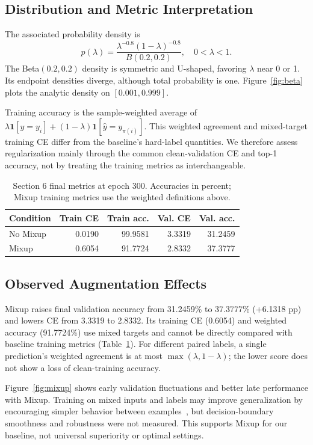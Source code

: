 \documentclass[letterpaper]{article}
\begin{document}
\subsection{Distribution and Metric Interpretation}
The associated probability density is
\begin{equation}
p(\lambda)=\frac{\lambda^{-0.8}(1-\lambda)^{-0.8}}{B(0.2,0.2)},
\quad 0<\lambda<1.
\end{equation}
The Beta$(0.2,0.2)$ density is symmetric and U-shaped, favoring $\lambda$ near
0 or 1. Its endpoint densities diverge, although total probability is one.
Figure~\ref{fig:beta} plots the analytic density on $[0.001,0.999]$.


Training accuracy is the sample-weighted average of
$\lambda\mathbf1[\hat y=y_i]+(1-\lambda)\mathbf1[\hat y=y_{\pi(i)}]$.
This weighted agreement and mixed-target training CE differ from the baseline's
hard-label quantities. We therefore assess regularization mainly through the
common clean-validation CE and top-1 accuracy, not by treating the training
metrics as interchangeable.

\begin{table}[t]
\centering\small
\begin{tabular}{lrrrr}\toprule
Condition & Train CE & Train acc. & Val. CE & Val. acc.\\\midrule
No Mixup & 0.0190 & 99.9581 & 3.3319 & 31.2459 \\
Mixup & 0.6054 & 91.7724 & 2.8332 & 37.3777 \\
\bottomrule\end{tabular}
\normalsize
\caption{Section 6 final metrics at epoch 300. Accuracies in percent; Mixup
training metrics use the weighted definitions above.}
\label{tab:mixup}
\end{table}

\subsection{Observed Augmentation Effects}
Mixup raises final validation accuracy from 31.2459\% to 37.3777\%
(+6.1318 pp) and lowers CE from 3.3319 to 2.8332. Its training CE (0.6054) and
weighted accuracy (91.7724\%) use mixed targets and cannot be directly compared
with baseline training metrics (Table~\ref{tab:mixup}). For different paired
labels, a single prediction's weighted agreement is at most
$\max(\lambda,1-\lambda)$; the lower score does not show a loss of
clean-training accuracy.

Figure~\ref{fig:mixup} shows early validation fluctuations and better late
performance with Mixup. Training on mixed inputs and labels may improve
generalization by encouraging simpler behavior between
examples~\cite{zhang2018mixup}, but decision-boundary smoothness and robustness
were not measured. This supports Mixup for our baseline, not universal
superiority or optimal settings.
\end{document}
